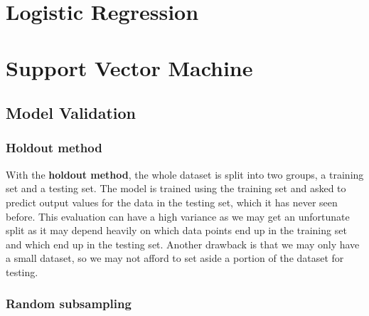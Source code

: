 \documentclass[11pt,fleqn]{book} %
\begin{document}


\chapter{Logistic Regression}



\chapter{Support Vector Machine}

\section{Model Validation}
\subsection{Holdout method}
With the \textbf{holdout method}, the whole dataset is split into two groups, a training set and a testing set. The model is trained using the training set and asked to predict output values for the data in the testing set, which it has never seen before. This evaluation can have a high variance as we may get an unfortunate split as it may depend heavily on which data points end up in the training set and which end up in the testing set. Another drawback is that we may only have a small dataset, so we may not afford to set aside a portion of the dataset for testing.

\subsection{Random subsampling}
\end{document}
